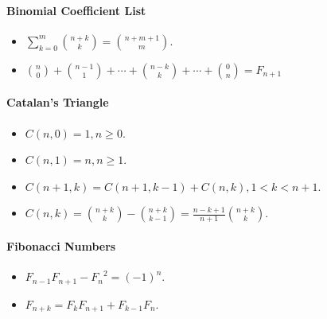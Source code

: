 \paragraph{Binomial Coefficient List}
\begin{itemize}
    \item $\sum_{k = 0}^m \binom {n + k} k = \binom {n + m + 1} m$.
    \item $\binom n 0 + \binom {n-1} 1 + \cdots + \binom {n-k} k + \cdots + \binom 0 n = F_{n+1} $
\end{itemize}
\paragraph{Catalan's Triangle}
\begin{itemize}
	\item $C(n,0) = 1, n\ge0$.
	\item $C(n,1) = n, n\ge1$.
	\item $C(n+1,k) = C(n+1,k-1) + C(n,k), 1 < k < n + 1$.
	\item $C(n,k) = \binom {n+k} {k} - \binom {n+k} {k-1} = \frac{n-k+1}{n+1}\binom{n+k}{k}$.
\end{itemize}
\paragraph{Fibonacci Numbers}
\begin{itemize}
	\item $F_{n-1}F_{n+1} - {F_n}^2 = {(-1)}^n $.
	\item $F_{n+k} = F_kF_{n+1} + F_{k-1}F_n$.
\end{itemize}
